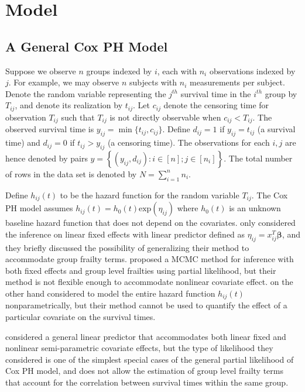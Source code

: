 \documentclass[ba]{imsart}
\begin{document}
\section{Model}\label{sec:model}

\subsection{A General Cox PH Model}

Suppose we observe $n$ groups indexed by $i$, each with $n_{i}$ observations indexed by $j$. For example, we may observe $n$ subjects with $n_{i}$ measurements per subject. Denote the random variable representing the $j^{th}$ survival time in the $i^{th}$ group by $T_{ij}$, and denote its realization by $t_{ij}$. Let $c_{ij}$ denote the censoring time for observation $T_{ij}$ such that $T_{ij}$ is not directly observable when $c_{ij} < T_{ij}$. The observed survival time is $y_{ij} = \min\{t_{ij},c_{ij}\}$. Define $d_{ij} = 1$ if $y_{ij} = t_{ij}$ (a survival time) and $d_{ij} = 0$ if $t_{ij} > y_{ij}$ (a censoring time). The observations for each $i,j$ are hence denoted by pairs $y =  \left\{(y_{ij},d_{ij}): i\in[n]; j\in[n_{i}] \right\}$. The total number of rows in the data set is denoted by $N = \sum_{i=1}^{n}n_{i}$.

Define $h_{ij}(t)$ to be the hazard function for the random variable $T_{ij}$. The Cox PH model assumes $h_{ij}(t) = h_0(t)\text{exp}(\eta_{ij})$ where $h_0(t)$ is an unknown baseline hazard function that does not depend on the covariates. \cite{BayesianPartialMCMC} only considered the inference on linear fixed effects with linear predictor defined as $\eta_{ij} = x_{ij}^T \boldsymbol{\beta}$, and they briefly discussed the possibility of generalizing their method to accommodate group frailty terms. \cite{PartialandFull2} proposed a MCMC method for inference with both fixed effects and group level frailties using partial likelihood, but their method is not flexible enough to accommodate nonlinear covariate effect.
\cite{BayesianNonpara} on the other hand considered to model the entire hazard function $h_{ij}(t)$ nonparametrically, but their method cannot be used to quantify the effect of a particular covariate on the survival times.

\cite{casecross} considered a general linear predictor that accommodates both linear fixed and nonlinear semi-parametric covariate effects, but the type of likelihood they considered is one of the simplest special cases of the general partial likelihood of Cox PH model, and does not allow the estimation of group level frailty terms that account for the correlation between survival times within the same group.
\end{document}
